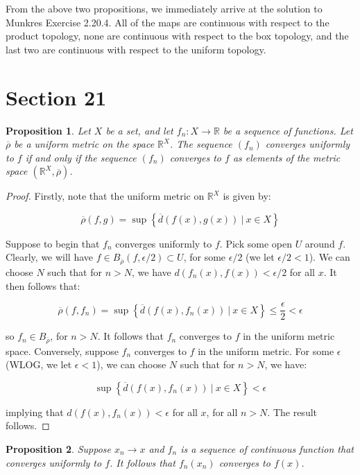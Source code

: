 \documentclass[10pt, oneside]{amsart}
\newtheorem{prop}{Proposition}
\begin{document}
    From the above two propositions, we immediately arrive at the solution to Munkres Exercise 2.20.4. All of the maps are continuous with respect to the product topology, none are continuous with respect to the box topology, and the last two are
    continuous with respect to the uniform topology.

    \section{Section 21}

    \begin{prop}
      Let $X$ be a set, and let $f_n : X \rightarrow \mathbb{R}$ be a sequence of functions. Let $\overline{\rho}$ be a uniform metric on the space $\mathbb{R}^{X}$. The sequence
      $(f_n)$ converges uniformly to $f$ if and only if the sequence $(f_n)$ converges to $f$ as elements of the metric space $(\mathbb{R}^{X}, \overline{\rho})$.
    \end{prop}

    \begin{proof}
      Firstly, note that the uniform metric on $\mathbb{R}^{X}$ is given by:

      $$\overline{\rho}(f, g) = \sup \left\{ \overline{d}(f(x), g(x)) \ | \ x \in X \right\}$$

      Suppose to begin that $f_n$ converges uniformly to $f$. Pick some open $U$
      around $f$. Clearly, we will have $f \in B_{\overline{\rho}}(f, \epsilon/2) \subset U$, for some $\epsilon/2$ (we let $\epsilon/2 < 1$).
      We can choose $N$ such that for $n > N$, we have $d(f_n(x), f(x)) < \epsilon/2$ for all $x$. It then follows that:

      $$\overline{\rho}(f, f_n) = \sup \left\{ \overline{d}(f(x), f_n(x)) \ | \ x \in X \right\} \leq \frac{\epsilon}{2} < \epsilon$$

      so $f_n \in B_{\overline{\rho}}$, for $n > N$. It follows that $f_n$ converges to $f$ in the uniform metric space. Conversely, suppose
      $f_n$ converges to $f$ in the uniform metric. For some $\epsilon$ (WLOG, we let $\epsilon < 1$), we can choose $N$ such that for $n > N$, we have:


      $$\sup \left\{ \overline{d}(f(x), f_n(x)) \ | \ x \in X \right\} < \epsilon$$

      implying that $d(f(x), f_n(x)) < \epsilon$ for all $x$, for all $n > N$. The result follows.
    \end{proof}

    \begin{prop}
      Suppose $x_n \rightarrow x$ and $f_n$ is a sequence of continuous function that converges uniformly to $f$. It follows that $f_n(x_n)$ converges to $f(x)$.
    \end{prop}
\end{document}

